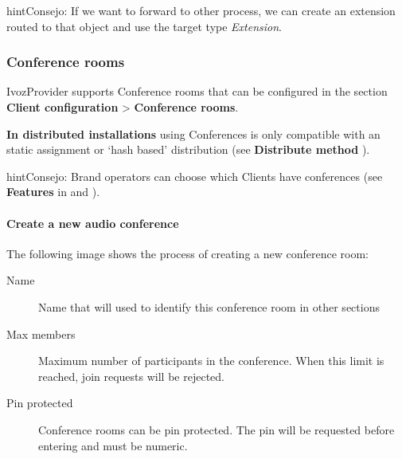 \documentclass[letterpaper,10pt,spanish]{sphinxmanual}
\begin{document}
\begin{notice}{hint}{Consejo:}
If we want to forward to other process, we can create an extension
routed to that object and use the target type \emph{Extension}.
\end{notice}


\subsubsection{Conference rooms}
\label{administration_portal/client/vpbx/routing_endpoints/conference_rooms::doc}\label{administration_portal/client/vpbx/routing_endpoints/conference_rooms:conference-rooms}\label{administration_portal/client/vpbx/routing_endpoints/conference_rooms:id1}
IvozProvider supports Conference rooms that can be configured in the section
\textbf{Client configuration} \textgreater{} \textbf{Conference rooms}.

\textbf{In distributed installations} using Conferences is only compatible with an static
assignment or `hash based' distribution (see \textbf{Distribute method} {\hyperref[administration_portal/brand/clients/virtual_pbx:virtual\string-pbx]{}}).

\begin{notice}{hint}{Consejo:}
Brand operators can choose which Clients have conferences (see \textbf{Features}
in {\hyperref[getting_started/internal_calls/brand_portal:brand\string-configuration]{}} and {\hyperref[getting_started/internal_calls/client_portal:client\string-configuration]{}}).
\end{notice}
\paragraph{Create a new audio conference}

The following image shows the process of creating a new conference room:
\begin{description}
\item[{Name}] \leavevmode{}\label{administration_portal/client/vpbx/routing_endpoints/conference_rooms:term-name}
Name that will used to identify this conference room in other sections

\item[{Max members}] \leavevmode{}\label{administration_portal/client/vpbx/routing_endpoints/conference_rooms:term-max-members}
Maximum number of participants in the conference. When this limit is
reached, join requests will be rejected.

\item[{Pin protected}] \leavevmode{}\label{administration_portal/client/vpbx/routing_endpoints/conference_rooms:term-pin-protected}
Conference rooms can be pin protected. The pin will be requested before
entering and must be numeric.

\end{description}
\end{document}
